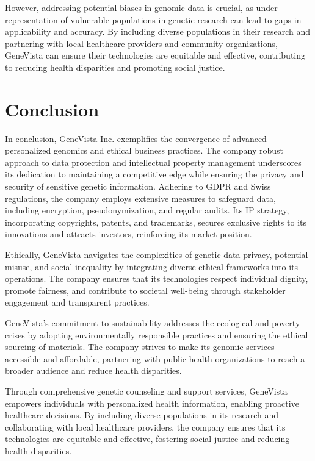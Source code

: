 \documentclass[a4paper]{article}
\begin{document}
However, addressing potential biases in genomic data is crucial, as under-representation of vulnerable populations in genetic research can lead to gaps in applicability and accuracy. By including diverse populations in their research and partnering with local healthcare providers and community organizations, GeneVista can ensure their technologies are equitable and effective, contributing to reducing health disparities and promoting social justice.

\section{Conclusion}

In conclusion, GeneVista Inc. exemplifies the convergence of advanced personalized genomics and ethical business practices. The company robust approach to data protection and intellectual property management underscores its dedication to maintaining a competitive edge while ensuring the privacy and security of sensitive genetic information. Adhering to GDPR and Swiss regulations, the company employs extensive measures to safeguard data, including encryption, pseudonymization, and regular audits. Its IP strategy, incorporating copyrights, patents, and trademarks, secures exclusive rights to its innovations and attracts investors, reinforcing its market position.

Ethically, GeneVista navigates the complexities of genetic data privacy, potential misuse, and social inequality by integrating diverse ethical frameworks into its operations. The company ensures that its technologies respect individual dignity, promote fairness, and contribute to societal well-being through stakeholder engagement and transparent practices.

GeneVista's commitment to sustainability addresses the ecological and poverty crises by adopting environmentally responsible practices and ensuring the ethical sourcing of materials. The company strives to make its genomic services accessible and affordable, partnering with public health organizations to reach a broader audience and reduce health disparities.

Through comprehensive genetic counseling and support services, GeneVista empowers individuals with personalized health information, enabling proactive healthcare decisions. By including diverse populations in its research and collaborating with local healthcare providers, the company ensures that its technologies are equitable and effective, fostering social justice and reducing health disparities.
\end{document}
